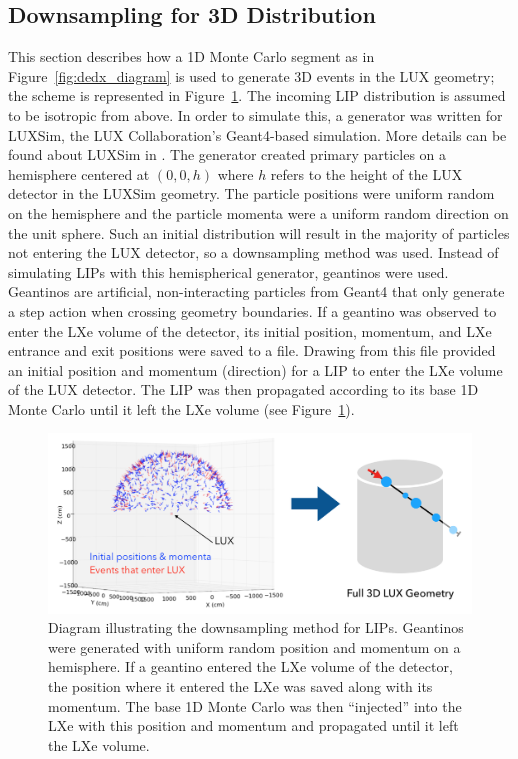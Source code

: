 \subsection{Downsampling for 3D Distribution}
This section describes how a 1D Monte Carlo segment as in Figure~\ref{fig:dedx_diagram} is used to generate 3D events in the \ac{LUX} geometry; the scheme is represented in Figure~\ref{fig:downsample}. The incoming \ac{LIP} distribution is assumed to be isotropic from above. In order to simulate this, a generator was written for LUXSim, the \ac{LUX} Collaboration's Geant4-based simulation. More details can be found about LUXSim in \cite{LUXSim}. The generator created primary particles on a hemisphere centered at $(0,0,h)$ where $h$ refers to the height of the \ac{LUX} detector in the LUXSim geometry. The particle positions were uniform random on the hemisphere and the particle momenta were a uniform random direction on the unit sphere. Such an initial distribution will result in the majority of particles not entering the \ac{LUX} detector, so a downsampling method was used. Instead of simulating \ac{LIP}s with this hemispherical generator, geantinos were used. Geantinos are artificial, non-interacting particles from Geant4 that only generate a step action when crossing geometry boundaries. If a geantino was observed to enter the \ac{LXe} volume of the detector, its initial position, momentum, and \ac{LXe} entrance and exit positions were saved to a file. Drawing from this file provided an initial position and momentum (direction) for a \ac{LIP} to enter the \ac{LXe} volume of the \ac{LUX} detector. The \ac{LIP} was then propagated according to its base 1D Monte Carlo until it left the \ac{LXe} volume (see Figure~\ref{fig:downsample}).


\begin{figure}[htbp]
\begin{center}
\includegraphics[width=\textwidth]{figures/lips/downsample.png}
\caption{Diagram illustrating the downsampling method for \acs{LIP}s. Geantinos were generated with uniform random position and momentum on a hemisphere. If a geantino entered the \acs{LXe} volume of the detector, the position where it entered the \acs{LXe} was saved along with its momentum. The base 1D Monte Carlo was then ``injected''  into the \acs{LXe} with this position and momentum and propagated until it left the \acs{LXe} volume. }
\label{fig:downsample}
\end{center}
\end{figure}

